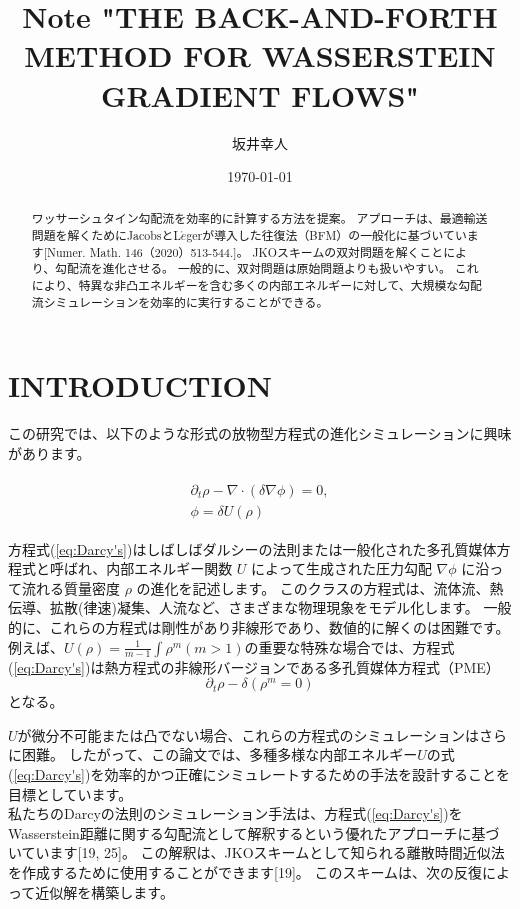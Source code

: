 \documentclass{jsarticle}
\title{Note  "THE BACK-AND-FORTH METHOD FOR WASSERSTEIN GRADIENT FLOWS"}
\author{坂井幸人}
\date{\today}
\theoremstyle{definition}
\begin{document}
\maketitle

\begin{abstract}
    ワッサーシュタイン勾配流を効率的に計算する方法を提案。
    アプローチは、最適輸送問題を解くためにJacobsとL$\acute{e}$gerが導入した往復法（BFM）の一般化に基づいています[Numer. Math. 146（2020）513-544.]。
    JKOスキームの双対問題を解くことにより、勾配流を進化させる。
    一般的に、双対問題は原始問題よりも扱いやすい。
    これにより、特異な非凸エネルギーを含む多くの内部エネルギーに対して、大規模な勾配流シミュレーションを効率的に実行することができる。
\end{abstract}

\section{INTRODUCTION}

この研究では、以下のような形式の放物型方程式の進化シミュレーションに興味があります。

\begin{align}
    \begin{split}
        \label{eq:Darcy's}
        \partial_t \rho - \nabla \cdot (\delta \nabla \phi) = 0, \\
        \phi = \delta U(\rho)
    \end{split}
\end{align}


方程式(\ref{eq:Darcy's})はしばしばダルシーの法則または一般化された多孔質媒体方程式と呼ばれ、内部エネルギー関数 $U$ によって生成された圧力勾配 $\nabla \phi$ に沿って流れる質量密度 $\rho$ の進化を記述します。
このクラスの方程式は、流体流、熱伝導、拡散(律速)凝集、人流など、さまざまな物理現象をモデル化します。
一般的に、{\color{red}これらの方程式は剛性があり非線形であり、数値的に解くのは困難です。}
例えば、$U(\rho) = \frac{1}{m - 1} \int \rho^m (m > 1)$の重要な特殊な場合では、方程式(\ref{eq:Darcy's})は熱方程式の非線形バージョンである多孔質媒体方程式（PME） 
$$
    \partial_t \rho - \delta(\rho^m = 0)
$$
となる。


$U$が微分不可能または凸でない場合、これらの方程式のシミュレーションはさらに困難。
したがって、この論文では、多種多様な内部エネルギー$U$の式(\ref{eq:Darcy's})を効率的かつ正確にシミュレートするための手法を設計することを目標としています。\\

私たちのDarcyの法則のシミュレーション手法は、方程式(\ref{eq:Darcy's})をWasserstein距離に関する勾配流として解釈するという優れたアプローチに基づいています[19, 25]。
この解釈は、JKOスキームとして知られる離散時間近似法を作成するために使用することができます[19]。
このスキームは、次の反復によって近似解を構築します。
\end{document}
